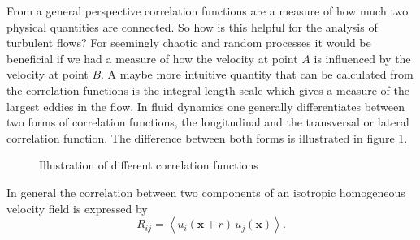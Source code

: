 \documentclass[preprint,12pt,ntfdMod]{elsarticle}
\begin{document}
\begin{par}

\label{sec:correlation}
From a general perspective correlation functions are a measure of how
much two physical quantities are connected. So how is this helpful for
the analysis of turbulent flows? For seemingly chaotic and random
processes it would be beneficial if we had a measure of how the velocity
at point $A$ is influenced by the velocity at point $B$. A maybe more
intuitive quantity that can be calculated from the correlation functions
is the integral length scale which gives a measure of the largest
eddies in the flow. In fluid dynamics one generally differentiates
between two forms of correlation functions, the longitudinal and the
transversal or lateral correlation function. The difference between both forms is
illustrated in figure \ref{fig:correlations}.
\begin{figure}[t!]
        \centering
        \hfill
\caption{Illustration of different correlation functions}
\label{fig:correlations}
\end{figure}
In general the correlation between two components of an isotropic
homogeneous velocity field is expressed by
  \begin{equation}
      R_{ij} = \left<u_i(\mathbf{x}+r)\,u_j(\mathbf{x})\right>.

\end{equation}
\end{par}
\end{document}
